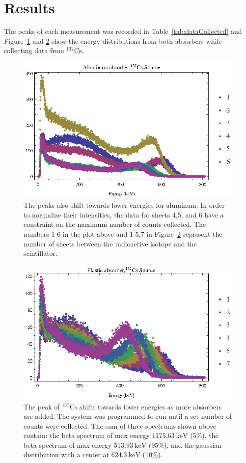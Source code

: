 \section{Results} %
\label{sec:results}
The peaks of each measurement was recorded in Table~\ref{tab:dataCollected} and Figure~\ref{fig:Figures_aluminumShiftsPlot} and \ref{fig:Figures_plasticShiftsPlot} show the energy distributions from both absorbers while collecting data from $^{137}\text{Cs}$.
\begin{figure}[tbp]
	\centering
		\includegraphics[width=.9\textwidth]{Figures/aluminumShiftsPlot.eps}
	\caption{The peaks also shift towards lower energies for aluminum. In order to normalize their intensities, the data for sheets 4,5, and 6 have a constraint on the maximum number of counts collected.  The numbers 1-6 in the plot above and 1-5,7 in Figure~\ref{fig:Figures_plasticShiftsPlot} represent the number of sheets between the radioactive isotope and the scintillator.}
	\label{fig:Figures_aluminumShiftsPlot}
\end{figure}%
\begin{figure}[tbp]
	\centering
		\includegraphics[width=.9\textwidth]{Figures/plasticShiftsPlot.eps}
	\caption{The peak of $^{137}\text{Cs}$ shifts towards lower energies as more absorbers are added.  The system was programmed to run until a set number of counts were collected.  The sum of three spectrums shown above contain: the beta spectrum of max energy $1175.63~\text{keV}$ (5\%), the beta spectrum of max energy $513.93~\text{keV}$ (95\%), and the gaussian distribution with a center at $624.3~\text{keV}$ (10\%).}
	\label{fig:Figures_plasticShiftsPlot}
\end{figure}%
